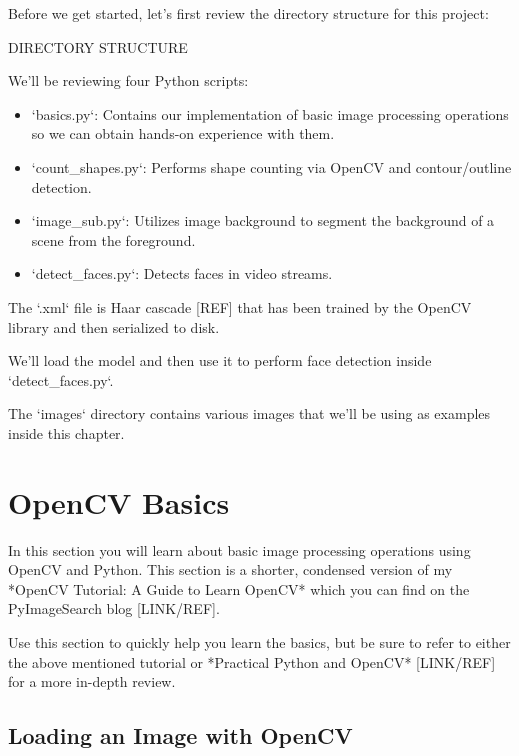 Before we get started, let’s first review the directory structure for this project:

DIRECTORY STRUCTURE


We’ll be reviewing four Python scripts:

\begin{itemize}
    \item `basics.py`: Contains our implementation of basic image processing operations so we can obtain hands-on experience with them.
    \item `count_shapes.py`: Performs shape counting via OpenCV and contour/outline detection.
    \item `image_sub.py`: Utilizes image background to segment the background of a scene from the foreground.
    \item `detect_faces.py`: Detects faces in video streams.
\end{itemize}

The `.xml` file is Haar cascade [REF] that has been trained by the OpenCV library and then serialized to disk.

We’ll load the model and then use it to perform face detection inside `detect_faces.py`.

The `images` directory contains various images that we’ll be using as examples inside this chapter.


\section{OpenCV Basics}

In this section you will learn about basic image processing operations using OpenCV and Python. This section is a shorter, condensed version of my *OpenCV Tutorial: A Guide to Learn OpenCV* which you can find on the PyImageSearch blog [LINK/REF].

Use this section to quickly help you learn the basics, but be sure to refer to either the above mentioned tutorial or *Practical Python and OpenCV* [LINK/REF] for a more in-depth review.


\subsection{Loading an Image with OpenCV}

